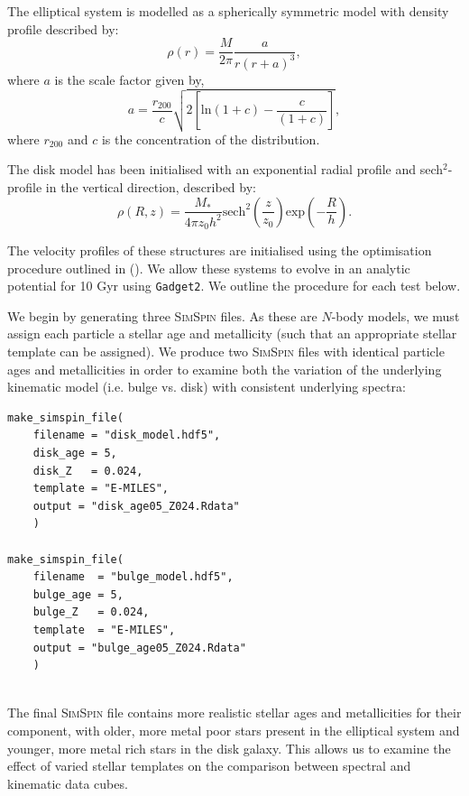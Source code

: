 \documentclass[
  journal=pasa,
  manuscript=research-paper, %
  year=2020,
  volume=37,
]{cup-journal}
\newcommand{\simspin}[1]{\textsc{SimSpin}#1} %
\newcommand{\citetoggle}[1]{\citeauthor{#1} (\citeyear{#1})}
\begin{document}
The elliptical system is modelled as a spherically symmetric model with density profile described by:
\begin{equation}
    \rho(r) = \frac{M}{2 \pi} \frac{a}{r(r+a)^3},
\end{equation}
where $a$ is the scale factor given by,
\begin{equation}
    a = \frac{r_{200}}{c}\sqrt{2 \left[ \text{ln}(1 + c) - \frac{c}{(1 + c)} \right]},
\end{equation}
where $r_{200}$ and $c$ is the concentration of the distribution. 

The disk model has been initialised with an exponential radial profile and sech$^{2}$-profile in the vertical direction, described by:
\begin{equation}
    \rho(R,z) = \frac{M_*}{4 \pi z_{0} h^2}\text{sech}^2\left( \frac{z}{z_{0}} \right)\text{exp}\left( - \frac{R}{h} \right).
\end{equation}

The velocity profiles of these structures are initialised using the optimisation procedure outlined in \citetoggle{Yurin2014AnEquilibrium}. 
We allow these systems to evolve in an analytic potential for 10 Gyr using \texttt{Gadget2}. We outline the procedure for each test below.

We begin by generating three \simspin{} files. 
As these are $N$-body models, we must assign each particle a stellar age and metallicity (such that an appropriate stellar template can be assigned). 
We produce two \simspin{} files with identical particle ages and metallicities in order to examine both the variation of the underlying kinematic model (i.e. bulge vs. disk) with consistent underlying spectra:
    
\begin{lstlisting}[basicstyle=\fontsize{10}{8}\selectfont\ttfamily]
make_simspin_file(
    filename = "disk_model.hdf5", 
    disk_age = 5, 
    disk_Z   = 0.024, 
    template = "E-MILES", 
    output = "disk_age05_Z024.Rdata"
    )
    
make_simspin_file(
    filename  = "bulge_model.hdf5", 
    bulge_age = 5, 
    bulge_Z   = 0.024, 
    template  = "E-MILES",
    output = "bulge_age05_Z024.Rdata"
    )
                  
\end{lstlisting}
    
The final \simspin{} file contains more realistic stellar ages and metallicities for their component, with older, more metal poor stars present in the elliptical system and younger, more metal rich stars in the disk galaxy. 
This allows us to examine the effect of varied stellar templates on the comparison between spectral and kinematic data cubes.
\end{document}
